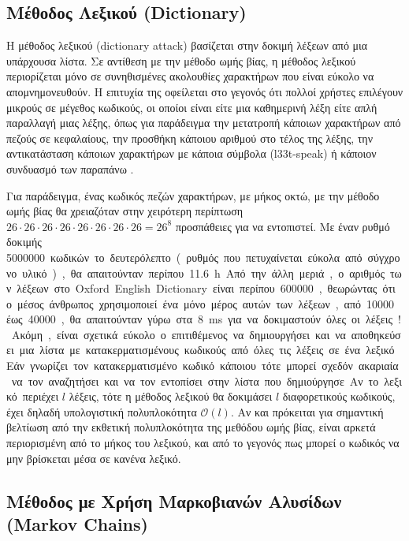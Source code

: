 \documentclass[11pt]{article}
\begin{document}
\subsection{Μέθοδος Λεξικού (Dictionary)}
\label{subsec:dictionary}

Η μέθοδος λεξικού (dictionary attack) βασίζεται στην δοκιμή λέξεων από μια υπάρχουσα λίστα. Σε αντίθεση με την μέθοδο ωμής βίας, η μέθοδος λεξικού περιορίζεται μόνο σε συνηθισμένες ακολουθίες χαρακτήρων που είναι εύκολο να απομνημονευθούν. Η επιτυχία της οφείλεται στο γεγονός ότι πολλοί χρήστες επιλέγουν μικρούς σε μέγεθος κωδικούς, οι οποίοι είναι είτε μια καθημερινή λέξη είτε απλή παραλλαγή μιας λέξης, όπως για παράδειγμα την μετατροπή κάποιων χαρακτήρων από πεζούς σε κεφαλαίους, την προσθήκη κάποιου αριθμού στο τέλος της λέξης, την αντικατάσταση κάποιων χαρακτήρων με κάποια σύμβολα (l33t-speak) ή κάποιον συνδυασμό των παραπάνω \cite{wiki:dictionary_attack}.

Για παράδειγμα, ένας κωδικός πεζών χαρακτήρων, με μήκος οκτώ, με την μέθοδο ωμής βίας θα χρειαζόταν στην χειρότερη περίπτωση $26 \cdot 26 \cdot 26 \cdot 26 \cdot 26 \cdot 26 \cdot 26 \cdot 26 = 26^8$  προσπάθειες για να εντοπιστεί. Με έναν ρυθμό δοκιμής \SI{5000000} κωδικών το δευτερόλεπτο (ρυθμός που πετυχαίνεται εύκολα από σύγχρονο υλικό), θα απαιτούνταν περίπου \SI{11.6}{h}.

Από την άλλη μεριά, ο αριθμός των λέξεων στο Oxford English Dictionary είναι περίπου \SI{600000}, θεωρώντας ότι ο μέσος άνθρωπος χρησιμοποιεί ένα μόνο μέρος αυτών των λέξεων, από \SI{10000} έως \SI{40000}, θα απαιτούνταν γύρω στα \SI{8}{ms} για να δοκιμαστούν όλες οι λέξεις!

Ακόμη, είναι σχετικά εύκολο ο επιτιθέμενος να δημιουργήσει και να αποθηκεύσει μια λίστα με κατακερματισμένους κωδικούς από όλες τις λέξεις σε ένα λεξικό. Εάν γνωρίζει τον κατακερματισμένο κωδικό κάποιου τότε μπορεί σχεδόν ακαριαία να τον αναζητήσει και να τον εντοπίσει στην λίστα που δημιούργησε.

Αν το λεξικό περιέχει $l$ λέξεις, τότε η μέθοδος λεξικού θα δοκιμάσει $l$ διαφορετικούς κωδικούς, έχει δηλαδή υπολογιστική πολυπλοκότητα $\mathcal{O}(l)$. Αν και πρόκειται για σημαντική βελτίωση από την εκθετική πολυπλοκότητα της μεθόδου ωμής βίας, είναι αρκετά περιορισμένη από το μήκος του λεξικού, και από το γεγονός πως μπορεί ο κωδικός να μην βρίσκεται μέσα σε κανένα λεξικό.

\subsection{Μέθοδος με Χρήση Μαρκοβιανών Αλυσίδων (Markov Chains)}
\label{subsec:markov_chains}
\end{document}
